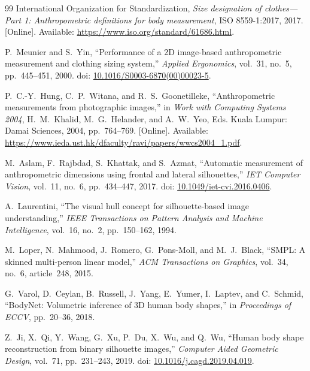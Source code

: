\documentclass[11pt,a4paper]{article}
\begin{document}
\begin{thebibliography}{99}
\small
\setlength{\itemsep}{0.1em}
\setlength{\parskip}{0pt}
International Organization for Standardization, \emph{Size designation of clothes---Part 1: Anthropometric definitions for body measurement}, ISO 8559-1:2017, 2017. [Online]. Available: \url{https://www.iso.org/standard/61686.html}.

P.~Meunier and S.~Yin, ``Performance of a 2D image-based anthropometric measurement and clothing sizing system,'' \emph{Applied Ergonomics}, vol.~31, no.~5, pp.~445--451, 2000. doi: \href{https://doi.org/10.1016/S0003-6870(00)00023-5}{10.1016/S0003-6870(00)00023-5}.

P.~C.-Y.~Hung, C.~P.~Witana, and R.~S.~Goonetilleke, ``Anthropometric measurements from photographic images,'' in \emph{Work with Computing Systems 2004}, H.~M.~Khalid, M.~G.~Helander, and A.~W.~Yeo, Eds. Kuala Lumpur: Damai Sciences, 2004, pp.~764--769. [Online]. Available: \url{https://www.ieda.ust.hk/dfaculty/ravi/papers/wwcs2004_1.pdf}.

M.~Aslam, F.~Rajbdad, S.~Khattak, and S.~Azmat, ``Automatic measurement of anthropometric dimensions using frontal and lateral silhouettes,'' \emph{IET Computer Vision}, vol.~11, no.~6, pp.~434--447, 2017. doi: \href{https://doi.org/10.1049/iet-cvi.2016.0406}{10.1049/iet-cvi.2016.0406}.

A.~Laurentini, ``The visual hull concept for silhouette-based image understanding,'' \emph{IEEE Transactions on Pattern Analysis and Machine Intelligence}, vol.~16, no.~2, pp.~150--162, 1994.

M.~Loper, N.~Mahmood, J.~Romero, G.~Pons-Moll, and M.~J.~Black, ``SMPL: A skinned multi-person linear model,'' \emph{ACM Transactions on Graphics}, vol.~34, no.~6, article~248, 2015.

G.~Varol, D.~Ceylan, B.~Russell, J.~Yang, E.~Yumer, I.~Laptev, and C.~Schmid, ``BodyNet: Volumetric inference of 3D human body shapes,'' in \emph{Proceedings of ECCV}, pp.~20--36, 2018.

Z.~Ji, X.~Qi, Y.~Wang, G.~Xu, P.~Du, X.~Wu, and Q.~Wu, ``Human body shape reconstruction from binary silhouette images,'' \emph{Computer Aided Geometric Design}, vol.~71, pp.~231--243, 2019. doi: \href{https://doi.org/10.1016/j.cagd.2019.04.019}{10.1016/j.cagd.2019.04.019}.


\end{thebibliography}
\end{document}
